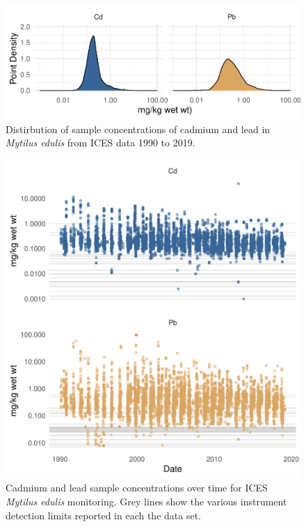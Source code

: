 \documentclass[
  12pt,
]{article}
\begin{document}
\begin{figure}
\centering
\includegraphics{McCrory_ENV972_Project_files/figure-latex/unnamed-chunk-5-1.pdf}
\caption{Distirbution of sample concentrations of cadmium and lead in
\emph{Mytilus edulis} from ICES data 1990 to 2019.}
\end{figure}

\begin{figure}
\centering
\includegraphics{McCrory_ENV972_Project_files/figure-latex/unnamed-chunk-6-1.pdf}
\caption{Cadmium and lead sample concentrations over time for ICES
\emph{Mytilus edulis} monitoring. Grey lines show the various instrument
detection limits reported in each the data set.}
\end{figure}
\end{document}

